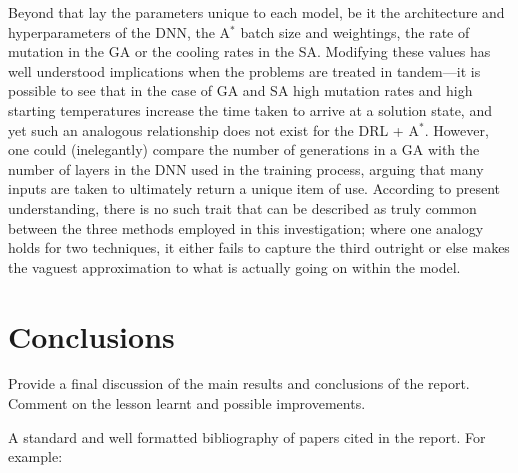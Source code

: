 \documentclass[UKenglish]{svproc}
\begin{document}
Beyond that lay the parameters unique to each model, be it the architecture and hyperparameters of the DNN, the A$^{\ast}$ batch size and weightings, the rate of mutation in the GA or the cooling rates in the SA. Modifying these values has well understood implications when the problems are treated in tandem---it is possible to see that in the case of GA and SA high mutation rates and high starting temperatures increase the time taken to arrive at a solution state, and yet such an analogous relationship does not exist for the DRL + A$^{\ast}$. However, one could (inelegantly) compare the number of generations in a GA with the number of layers in the DNN used in the training process, arguing that many inputs are taken to ultimately return a unique item of use. According to present understanding, there is no such trait that can be described as truly common between the three methods employed in this investigation; where one analogy holds for two techniques, it either fails to capture the third outright or else makes the vaguest approximation to what is actually going on within the model.

\section{Conclusions}
Provide a final discussion of the main results and conclusions of the report. Comment on the lesson learnt and possible improvements.


A standard and well formatted bibliography of papers cited in the report. For example:

\printbibliography
\end{document}

